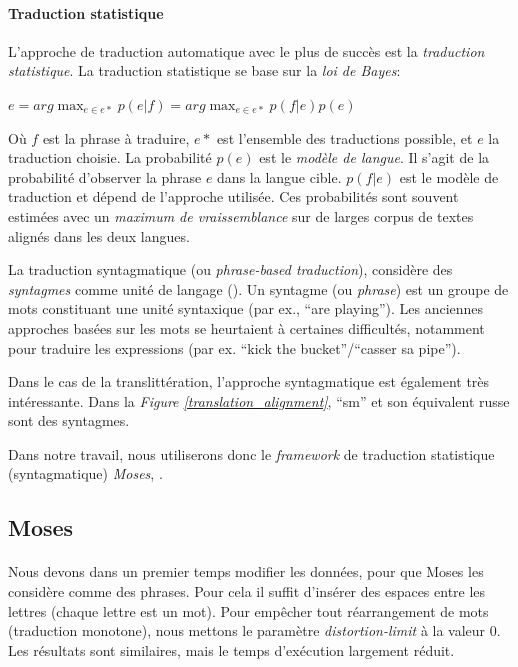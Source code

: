 \documentclass{article}
\begin{document}
\paragraph{Traduction statistique}
L'approche de traduction automatique avec le plus de succès est la \emph{traduction statistique}. La traduction statistique se base sur la \emph{loi de Bayes}:
\begin{center}
$\displaystyle e = arg \max_{e \in e*} p(e|f) = arg \max_{e \in e*} p(f|e)p(e)$
\end{center}
Où $f$ est la phrase à traduire, $e*$ est l'ensemble des traductions possible, et $e$ la traduction choisie. La probabilité $p(e)$ est le \emph{modèle de langue}. Il s'agit de la probabilité d'observer la phrase $e$ dans la langue cible. $p(f|e)$ est le modèle de traduction et dépend de l'approche utilisée. Ces probabilités sont souvent estimées avec un \emph{maximum de vraissemblance} sur de larges corpus de textes alignés dans les deux langues.


La traduction syntagmatique (ou \emph{phrase-based traduction}), considère des \emph{syntagmes} comme unité de langage (\cite{Koehn03}). Un syntagme (ou \emph{phrase}) est un groupe de mots constituant une unité syntaxique (par ex., ``are playing''). Les anciennes approches basées sur les mots se heurtaient à certaines difficultés, notamment pour traduire les expressions (par ex. ``kick the bucket''/``casser sa pipe'').

Dans le cas de la translittération, l'approche syntagmatique est également très intéressante. Dans la \emph{Figure \ref{translation_alignment}}, ``sm'' et son équivalent russe sont des syntagmes.

Dans notre travail, nous utiliserons donc le \emph{framework} de traduction statistique (syntagmatique) \emph{Moses}, \cite{Koehn07}.

\subsection{Moses}
\paragraph{}
Nous devons dans un premier temps modifier les données, pour que Moses les considère comme des phrases. Pour cela il suffit d'insérer des espaces entre les lettres (chaque lettre est un mot). Pour empêcher tout réarrangement de mots (traduction monotone), nous mettons le paramètre \emph{distortion-limit} à la valeur $0$. Les résultats sont similaires, mais le temps d'exécution largement réduit.
\end{document}
